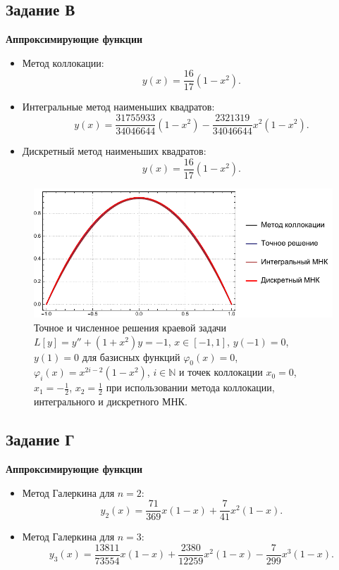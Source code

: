 \documentclass[
11pt,
master, %
subf, %
href, %
colorlinks=true, %
times, %
]{disser}
\begin{document}
\subsection{Задание В}
\textbf{Аппроксимирующие функции}
\begin{itemize}
  \item Метод коллокации:
  $$y(x) = \frac{16}{17} \left(1-x^2\right).$$
  \item Интегральные метод наименьших квадратов:
  $$y(x) = \frac{31755933}{34046644} \left(1-x^2\right) - \frac{2321319}{34046644} x^2 \left(1-x^2\right).$$
  \item Дискретный метод наименьших квадратов:
  $$y(x) = \frac{16}{17} \left(1-x^2\right).$$
\end{itemize}

\begin{figure}[h]
  \centering
  \includegraphics[width=0.8\linewidth]{plS3.pdf}
  \caption{Точное и численное решения краевой задачи $L[y] = y'' + \left(1+x^2\right)y = -1$, $x\in [-1,1]$, $y(-1) = 0$, $y(1) = 0$ для базисных функций $\varphi_0(x) = 0$, $\varphi_i (x) = x^{2i-2}\left(1 - x^2\right)$, $i\in \mathbb{N}$ и точек коллокации $x_0 = 0$, $x_1 = -\frac{1}{2}$, $x_2 = \frac{1}{2}$ при использовании метода коллокации, интегрального и дискретного МНК.}\label{ris:3}
\end{figure}

\newpage
\subsection{Задание Г}
\textbf{Аппроксимирующие функции}
\begin{itemize}
  \item Метод Галеркина для $n = 2$:
  $$y_2(x) = \frac{71}{369} x(1-x) + \frac{7}{41} x^2 (1-x).$$
  \item Метод Галеркина для $n = 3$:
  $$y_3(x) = \frac{13811}{73554} x(1-x) + \frac{2380}{12259} x^2 (1-x) - \frac{7}{299} x^3 (1-x).$$
\end{itemize}
\end{document}
